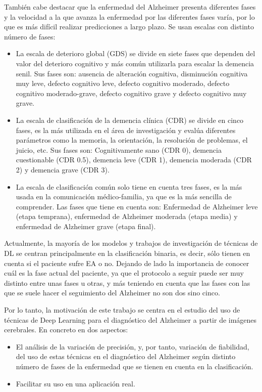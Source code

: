 También cabe destacar que la enfermedad del Alzheimer presenta diferentes fases y la velocidad a la que avanza la
enfermedad por las diferentes fases varía, por lo que es más difícil realizar predicciones a largo plazo.
Se usan escalas con distinto número de fases:
\begin{itemize}
    \item La escala de deterioro global (GDS) se divide en siete fases que dependen del valor del deterioro cognitivo y
    más común utilizarla para escalar la demencia senil.
    Sus fases son: ausencia de alteración cognitiva, disminución cognitiva muy leve, defecto cognitivo leve, defecto
    cognitivo moderado, defecto cognitivo moderado-grave, defecto cognitivo grave y defecto cognitivo muy grave.
    \item La escala de clasificación de la demencia clínica (CDR)  se divide en cinco fases, es la más utilizada en el
    área de investigación y evalúa diferentes parámetros como la memoria, la orientación, la resolución de problemas,
    el juicio, etc.
    Sus fases son: Cognitivamente sano (CDR 0), demencia cuestionable (CDR 0.5), demencia leve (CDR 1), demencia
    moderada (CDR 2) y demencia grave (CDR 3).
    \item La escala de clasificación común solo tiene en cuenta tres fases, es la más usada en la comunicación
    médico-familia, ya que es la más sencilla de comprender.
    Las fases que tiene en cuenta son: Enfermedad de Alzheimer leve (etapa temprana), enfermedad de Alzheimer moderada
    (etapa media) y enfermedad de Alzheimer grave (etapa final).\\
\end{itemize}


Actualmente, la mayoría de los modelos y trabajos de investigación de técnicas de DL se centran principalmente en la
clasificación binaria, es decir, sólo tienen en cuenta si el paciente sufre EA o no.
Dejando de lado la importancia de conocer cuál es la fase actual del paciente, ya que el protocolo a seguir puede ser
muy distinto entre unas fases u otras, y más teniendo en cuenta que las fases con las que se suele hacer el seguimiento
del Alzheimer no son dos sino cinco.

Por lo tanto, la motivación de este trabajo se centra en el estudio del uso de técnicas de Deep Learning para el
diagnóstico del Alzheimer a partir de imágenes cerebrales.
En concreto en dos aspectos:
\begin{itemize}
    \item El análisis de la variación de precisión, y, por tanto, variación de fiabilidad, del uso de estas técnicas en
    el diagnóstico del Alzheimer según distinto número de fases de la enfermedad que se tienen en cuenta en la
    clasificación.
    \item Facilitar su uso en una aplicación real. \\
\end{itemize}